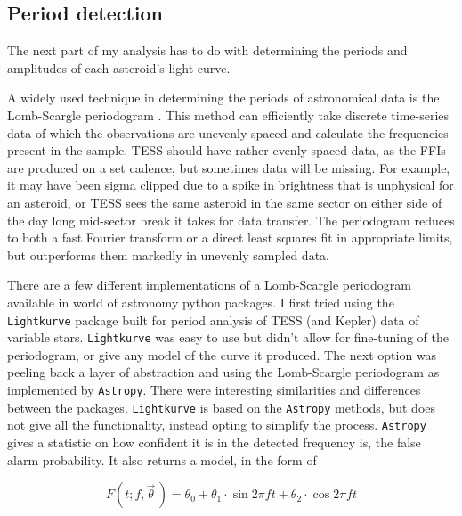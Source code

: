 \documentclass{UCreport}
\begin{document}
\subsection{Period detection}\label{SubSec:Periods}


The next part of my analysis has to do with determining the periods and amplitudes of each asteroid's light curve.

A widely used technique in determining the periods of astronomical data is the Lomb-Scargle periodogram \citep[\citet{Lomb1976,Scargle1982}, but see][for a review]{VanderPlas2018}.
This method can efficiently take discrete time-series data of which the observations are unevenly spaced and calculate the frequencies present in the sample.
TESS should have rather evenly spaced data, as the FFIs are produced on a set cadence, but sometimes data will be missing.
For example, it may have been sigma clipped due to a spike in brightness that is unphysical for an asteroid, or TESS sees the same asteroid in the same sector on either side of the day long mid-sector break it takes for data transfer.
The periodogram reduces to both a fast Fourier transform or a direct least squares fit in appropriate limits, but outperforms them markedly in unevenly sampled data.

There are a few different implementations of a Lomb-Scargle periodogram available in world of astronomy python packages.
I first tried using the \texttt{Lightkurve} \citep{Lightkurve2018} package built for period analysis of TESS (and Kepler) data of variable stars.
\texttt{Lightkurve} was easy to use but didn't allow for fine-tuning of the periodogram, or give any model of the curve it produced.
The next option was peeling back a layer of abstraction and using the Lomb-Scargle periodogram as implemented by \texttt{Astropy}\citep[\citet{Astropy2022} but see][for the implementation]{Vanderplas2012,Vanderplas2015}.
There were interesting similarities and differences between the packages.
\texttt{Lightkurve} is based on the \texttt{Astropy} methods, but does not give all the functionality, instead opting to simplify the process.
\texttt{Astropy} gives a statistic on how confident it is in the detected frequency is, the false alarm probability.
It also returns a model, in the form of

\begin{equation}
  \label{Eq:LCModel}
  F(t;f,\vec{\theta}\,) = \theta_0 + \theta_1\cdot\sin{2\pi ft} +\theta_2\cdot\cos{2\pi ft}
\end{equation}
\end{document}

